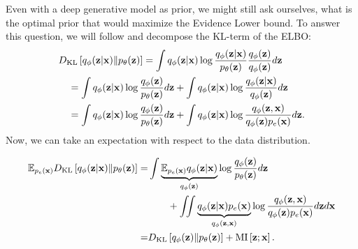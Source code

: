 Even with a deep generative model as prior, we might still ask ourselves, what is the optimal prior that would maximize the Evidence Lower bound. 
To answer this question, we will follow \citet{hoffman2016elbo} and decompose the KL-term of the ELBO:
\begin{align}
&D_{\mathrm{KL}}\left[q_{\phi}({\mathbf{z}}|{\mathbf{x}})\|p_{\theta}({\mathbf{z}})\right] = \int q_{\phi}({\mathbf{z}}|{\mathbf{x}}) \log \frac{q_{\phi}({\mathbf{z}}|{\mathbf{x}})}{p_{\theta}({\mathbf{z}})}\frac{q_{\phi}({\mathbf{z}})}{q_{\phi}({\mathbf{z}})}d{\mathbf{z}}\\
 &\quad=\int q_{\phi}({\mathbf{z}}|{\mathbf{x}}) \log \frac{q_{\phi}({\mathbf{z}})}{p_{\theta}({\mathbf{z}})}d{\mathbf{z}}  + \int  q_{\phi}({\mathbf{z}}|{\mathbf{x}}) \log \frac{q_{\phi}({\mathbf{z}}|{\mathbf{x}})}{q_{\phi}({\mathbf{z}})}d{\mathbf{z}}  \\
 &\quad=\int q_{\phi}({\mathbf{z}}|{\mathbf{x}}) \log \frac{q_{\phi}({\mathbf{z}})}{p_{\theta}({\mathbf{z}})}d{\mathbf{z}}  + \int  q_{\phi}({\mathbf{z}}|{\mathbf{x}}) \log \frac{q_{\phi}({\mathbf{z}}, {\mathbf{x}})}{q_{\phi}({\mathbf{z}}) p_e({\mathbf{x}})}d{\mathbf{z}}. 
\end{align}
Now, we can take an expectation with respect to the data distribution.

\begin{align}\label{eq:intro_kl_to_vamp}
\E_{p_e(\rvx)} \KL{q_{\phi}(\rvz|\rvx)}{p_{\theta}(\rvz)} = &\int \underbrace{\E_{p_e(\rvx)} q_{\phi}(\rvz|\rvx)}_{q_{\phi}(\rvz)} \log \frac{q_{\phi}(\rvz)}{p_{\theta}(\rvz)}d\rvz  \\
&\quad\quad+ \iint  \underbrace{q_{\phi}(\rvz|\rvx)p_e(\rvx)}_{q_{\phi}(\rvz, \rvx)} \log \frac{q_{\phi}(\rvz, \rvx)}{q_{\phi}(\rvz) p_e(\rvx)}d\rvz d\rvx \notag\\
= &\KL{q_{\phi}(\rvz)}{p_{\theta}(\rvz)}
+ \text{MI}\left[\rvz; \rvx\right].
\end{align}

